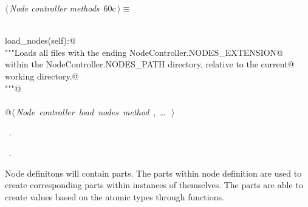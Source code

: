 \documentclass[
    a4paper,      %
    10pt,         %
    openright,    %
    notitlepage,  %
    parskip=half, %
]{scrreprt}       %
\theoremstyle{definition}                    %
\begin{document}
\begin{flushleft} \small
\begin{minipage}{\linewidth}\label{scrap99}\raggedright\small
{} $\langle\,${\itshape Node controller methods}\nobreak\ {\footnotesize {60c}}$\,\rangle\equiv$
\vspace{-1exm}
\begin{list}{}{} \item
\mbox{}\lstinline@@\\
\mbox{}\lstinline@def load_nodes(self):@\\
\mbox{}\lstinline@    """Loads all files with the ending NodeController.NODES_EXTENSION@\\
\mbox{}\lstinline@    within the NodeController.NODES_PATH directory, relative to the current@\\
\mbox{}\lstinline@    working directory.@\\
\mbox{}\lstinline@    """@\\
\mbox{}\lstinline@@\\
\mbox{}\lstinline@    @\hbox{$\langle\,${\itshape Node controller load nodes method}\nobreak\ {\footnotesize {}, \ldots\ }$\,\rangle$}\lstinline@@{\NWsep}
\end{list}
\vspace{-1.5ex}
\footnotesize
\begin{list}{}{\setlength{\itemsep}{-\parsep}\setlength{\itemindent}{-\leftmargin}}
\item \NWtxtMacroDefBy\ .
\item \NWtxtMacroRefIn\ .

\item{}
\end{list}
\end{minipage}\vspace{4ex}
\end{flushleft}
Node definitons will contain parts. The parts within node definition are
used to create corresponding parts within instances of themselves. The parts
are able to create values based on the atomic types through functions.
\end{document}
